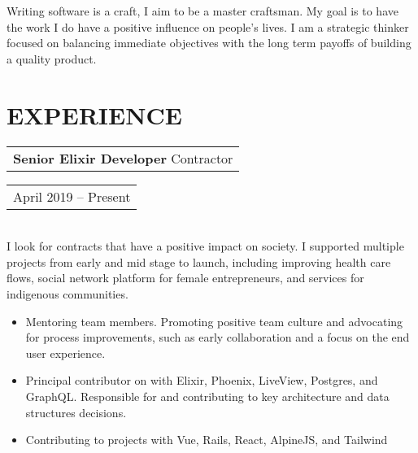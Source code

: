 \documentclass{resume}
\begin{document}

\address{\href{http://grahambaradoy.com}{grahambaradoy.com} \\ \href{https://www.github.com/baradoy}{github.com/baradoy}}
\address{ \href{mailto:graham@baradoy.ca}{graham@baradoy.ca} \\ 250-216-7112 }

\begin{resume}

\section{}
    Writing software is a craft, I aim to be a master craftsman.
    My goal is to have the work I do have a positive influence on people's lives.
    I am a strategic thinker focused on balancing immediate objectives with the long term payoffs of building a quality product.

\section{EXPERIENCE}

     \vspace{+0.1in}
    \begin{tabular}[t]{@{}l}
        {\bf Senior Elixir Developer} Contractor
    \end{tabular}\vspace{+0.05in}
    \hfill
    \begin{tabular}[t]{l@{}}
        April 2019 -- Present
    \end{tabular}\\
    I look for contracts that have a positive impact on society.
    I supported multiple projects from early and mid stage to launch, including improving health care flows, social network platform for female entrepreneurs, and services for indigenous communities.
    \vspace{+0.05in}
    \begin{itemize} \itemsep -2pt
    \item Mentoring team members. Promoting positive team culture and advocating for process improvements, such as early collaboration and a focus on the end user experience.
    \item Principal contributor on with Elixir, Phoenix, LiveView, Postgres, and GraphQL. Responsible for and contributing to key architecture and data structures decisions.
    \item Contributing to projects with Vue, Rails, React, AlpineJS, and Tailwind
    \end{itemize}



\end{resume}
\end{document}
